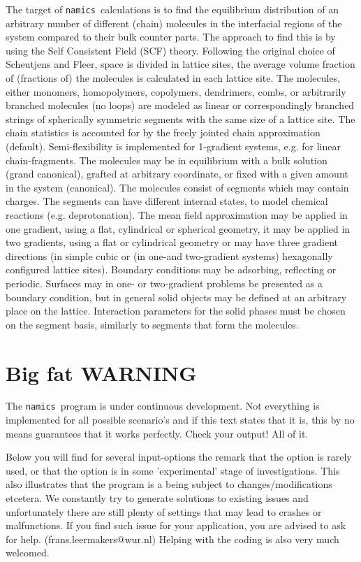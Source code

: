 \documentclass{article}
\newcommand{\namics}{{\tt namics}}
\begin{document}
The target of \namics\ calculations is to find the equilibrium distribution of an arbitrary number of different (chain) molecules in the interfacial regions of the system compared to their bulk counter parts. The approach to find this is by using the Self Consistent Field (SCF) theory. Following the original choice of Scheutjens and Fleer, space is divided in lattice	sites, the average volume fraction of (fractions of) the molecules is calculated in each lattice site. The molecules, either monomers, homopolymers, copolymers, dendrimers, combs, or arbitrarily branched molecules (no loops) are modeled as linear or correspondingly branched strings of spherically symmetric segments with the same size of a lattice site. The chain statistics is accounted for by the freely jointed chain approximation (default). Semi-flexibility is implemented for 1-gradient systems, e.g. for linear chain-fragments. The molecules may be in equilibrium	with a bulk	solution (grand canonical), grafted at arbitrary coordinate, or fixed with a given amount in the system (canonical).  The molecules	consist	of segments which may contain charges. The segments can have different internal states, to model chemical reactions (e.g. deprotonation). The mean field approximation may be applied in one gradient, using a flat, cylindrical or spherical geometry, it may be	applied	in two gradients, using a flat or cylindrical geometry or may have three gradient directions (in simple cubic or (in one-and two-gradient systems) hexagonally configured lattice sites).  Boundary conditions may	be adsorbing, reflecting or periodic. Surfaces	may in one- or two-gradient problems be presented as a boundary condition, but in general solid objects may be defined at an arbitrary place on the	lattice. Interaction parameters for the solid phases must be chosen on the segment basis, similarly to segments that form the molecules.

\section{Big fat WARNING} 

The \namics\ program is under continuous development. Not everything is implemented for all possible scenario's and if this text states that it is, this by no means guarantees that it works perfectly. Check your output! All of it. 

Below you will find for several input-options the remark that the option is rarely used, or that the option is in some 'experimental' stage of investigations. This also illustrates that the program is a being subject to changes/modifications etcetera. We constantly try to generate solutions to existing issues and unfortunately there are still plenty of settings that may lead to crashes or malfunctions. If you find such issue for your application, you are advised to ask for help. (frans.leermakers@wur.nl) Helping with the coding is also very much welcomed.
\end{document}
